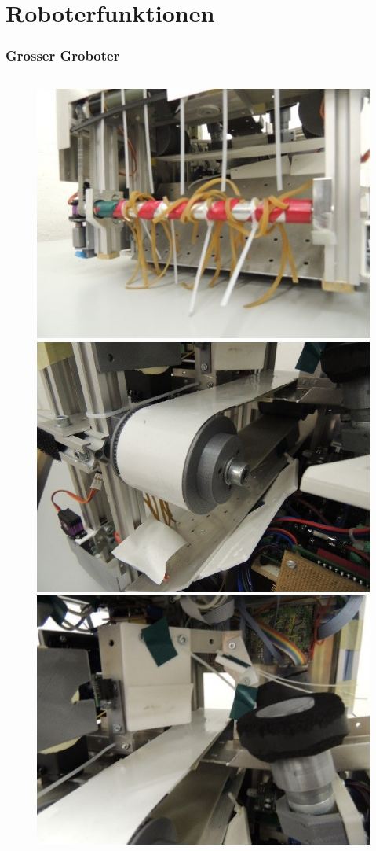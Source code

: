 \section{Roboterfunktionen}


\begin{frame}
	\frametitle{Grosser Groboter}
	\vspace{-1.5em}
	\begin{figure}
		\begin{columns}[t]
			\centering
			\includegraphics[width = 0.6\columnwidth]{../images/presentation/walze.jpg}\\\vspace{1em}
			\includegraphics[width = 0.6\columnwidth]{../images/presentation/riemen.jpg}\\
			\centering
			\includegraphics[width = 0.6\columnwidth]{../images/presentation/abstreifvorrichtung.jpg}\\\vspace{1em}

\end{columns}
\end{figure}
\end{frame}
